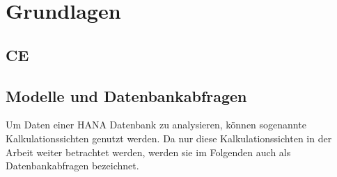 \chapter{Grundlagen}

\section{\acl{CE}}

\section{Modelle und Datenbankabfragen}
\label{sec:modells_db_queries}
Um Daten einer HANA Datenbank zu analysieren, können sogenannte
Kalkulationssichten genutzt werden. Da nur diese Kalkulationssichten in der
Arbeit weiter betrachtet werden, werden sie im Folgenden auch als
Datenbankabfragen bezeichnet. \autocite[Vgl.][]{SapHanaCreateCalcViews}

